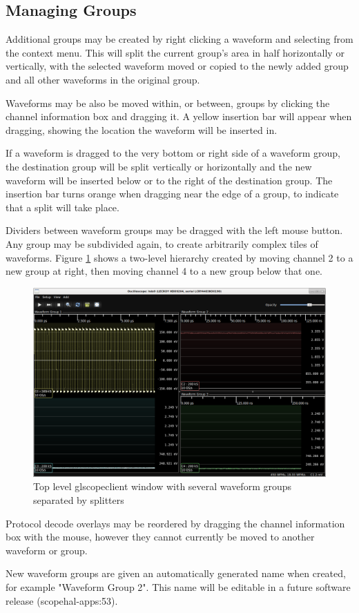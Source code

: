 \subsection{Managing Groups}

Additional groups may be created by right clicking a waveform and selecting  from the context menu. This will split the current group's area in half horizontally or
vertically, with the selected waveform moved or copied to the newly added group and all other waveforms in the original
group.

Waveforms may be also be moved within, or between, groups by clicking the channel information box and dragging it. A
yellow insertion bar will appear when dragging, showing the location the waveform will be inserted in.

If a waveform is dragged to the very bottom or right side of a waveform group, the destination group will be split
vertically or horizontally and the new waveform will be inserted below or to the right of the destination group. The
insertion bar turns orange when dragging near the edge of a group, to indicate that a split will take place.

Dividers between waveform groups may be dragged with the left mouse button. Any group may be subdivided again, to
create arbitrarily complex tiles of waveforms. Figure \ref{multiple-groups} shows a two-level hierarchy created by
moving channel 2 to a new group at right, then moving channel 4 to a new group below that one.

\begin{figure}[h]
\centering
\includegraphics[width=14cm]{images/multiple-groups.png}
\caption{Top level glscopeclient window with several waveform groups separated by splitters}
\label{multiple-groups}
\end{figure}

Protocol decode overlays may be reordered by dragging the channel information box with the mouse, however they cannot
currently be moved to another waveform or group.

New waveform groups are given an automatically generated name when created, for example "Waveform Group 2". This name
will be editable in a future software release (scopehal-apps:53).
